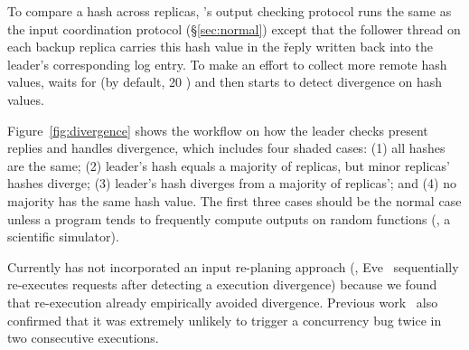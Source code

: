 To compare a hash across replicas, \xxx's output checking protocol runs the 
same as the input coordination protocol (\S\ref{sec:normal}) except that the 
follower thread on each backup replica carries this hash value in the \v{reply} 
written back into the leader's corresponding log entry. To make an effort to 
collect more remote hash values, \xxx waits for \twait (by default, 20 \us) 
and then starts to detect divergence on hash values.


Figure~\ref{fig:divergence} shows the workflow on how the leader checks 
present replies and handles divergence, which includes four shaded cases: 
(1) all hashes are the same; (2) leader's hash equals a majority of replicas, 
but minor replicas' hashes diverge; (3) leader's hash diverges from a majority 
of replicas'; and (4) no majority has the same hash value. The first three 
cases should be the normal case unless a program tends to frequently compute 
outputs on random functions (\eg, a scientific simulator).

Currently \xxx has not incorporated an input re-planing approach (\eg, 
Eve~\cite{eve:osdi12} sequentially re-executes requests after detecting a 
execution divergence) because we found that re-execution already empirically
avoided divergence. Previous work~\cite{lu:concurrency-bugs,pres:sosp09} 
also confirmed that it was extremely unlikely to trigger a concurrency bug 
twice in two consecutive executions.


